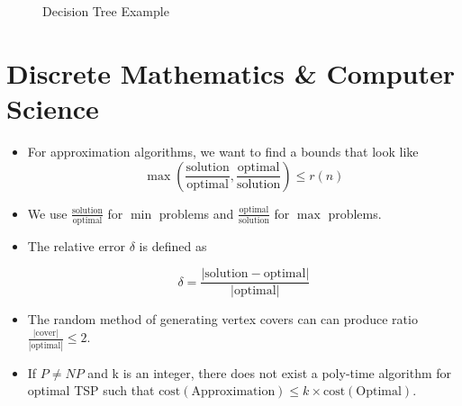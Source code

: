 \documentclass[12pt]{scrartcl}
\newcommand{\cost}[1]{\text{cost}\left(#1\right)}
\begin{document}
\begin{figure}
    \caption{Decision Tree Example}
\end{figure}


\section{Discrete Mathematics \& Computer Science}
\begin{itemize}
    \item For approximation algorithms, we want to find a bounds that look like
        \begin{equation*}
            \max\left(\frac{\text{solution}}{\text{optimal}}, \frac{\text{optimal}}{\text{solution}}\right) \leq r(n)
        \end{equation*}

    \item We use $\frac{\text{solution}}{\text{optimal}}$ for $\min$ problems and $\frac{\text{optimal}}{\text{solution}}$ for $\max$ problems.

    \item The relative error $\delta$ is defined as

        \begin{equation*}
            \delta = \frac{|\text{solution} - \text{optimal}|}{|\text{optimal}|}
        \end{equation*}

    \item The random method of generating vertex covers can can produce ratio $\frac{|\text{cover}|}{|\text{optimal}|} \leq 2$.

    \item If $P \neq NP$ and k is an integer, there does not exist a poly-time algorithm for optimal TSP such that $\cost{\text{Approximation}} \leq k \times \cost{\text{Optimal}}$.
\end{itemize}
\end{document}
